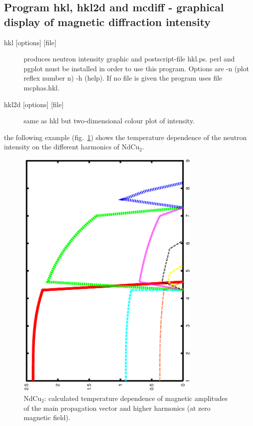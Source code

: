 \subsection{Program {\prg hkl}, {\prg hkl2d} and {\prg mcdiff} - graphical %
display of magnetic diffraction intensity}
\begin{description} 
\item [{{\prg hkl} [options] [file]} ]                   produces neutron intensity graphic
 and postscript-file {\prg hkl.ps}. {\prg perl} and
{\prg pgplot} must be installed in order to use this program.
 Options are -n (plot reflex number n)
-h (help). If no file is given the program uses file {\prg mcphas.hkl}.
\item [{{\prg hkl2d} [options] [file]} ]   same as {\prg hkl} but two-dimensional colour %
plot of intensity.
\end{description} 
the following example (fig.~\ref{neutintgraphic}) shows the temperature dependence of the neutron intensity
on the different harmonics of NdCu$_2$.

\begin{figure}[htb]%
\begin{center}\leavevmode
\includegraphics[angle=-90, width=0.8\textwidth]{../examples/ndcu2b/resultss/hkl.ps}
\end{center}
\caption{NdCu$_2$: calculated temperature dependence of magnetic amplitudes of the
main propagation vector and higher harmonics (at zero magnetic field).}
\label{neutintgraphic}
\end{figure}

